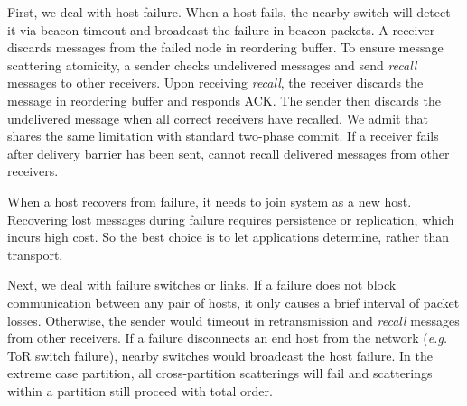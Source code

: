 {First, we deal with host failure.
When a host fails, the nearby switch will detect it via beacon timeout and broadcast the failure in beacon packets.
A receiver discards messages from the failed node in reordering buffer.
To ensure message scattering atomicity, a sender checks undelivered messages and send \textit{recall} messages to other receivers.
Upon receiving \textit{recall}, the receiver discards the message in reordering buffer and responds ACK.
The sender then discards the undelivered message when all correct receivers have recalled.
We admit that \sys shares the same limitation with standard two-phase commit.
If a receiver fails after delivery barrier has been sent, \sys cannot recall delivered messages from other receivers.

When a host recovers from failure, it needs to join \sys system as a new host.
Recovering lost messages during failure requires persistence or replication, which incurs high cost. So the best choice is to let applications determine, rather than \sys transport.

Next, we deal with failure  switches or links.
If a failure does not block communication between any pair of hosts, it only causes a brief interval of packet losses.
Otherwise, the sender would timeout in retransmission and \textit{recall} messages from other receivers.
If a failure disconnects an end host from the network (\textit{e.g.} ToR switch failure), nearby switches would broadcast the host failure.
In the extreme case  partition, all cross-partition scatterings will fail and scatterings within a partition still proceed with total order.


}
